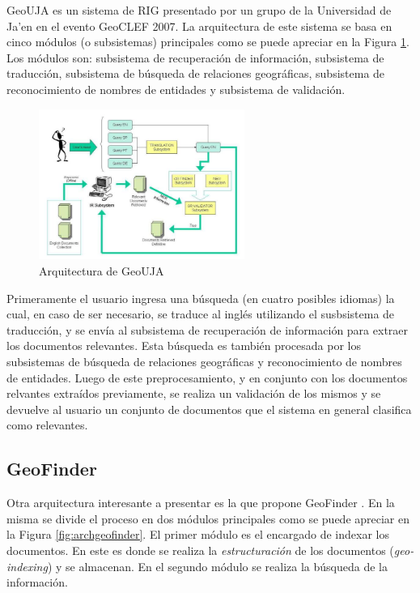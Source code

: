 \documentclass{llncs}
\begin{document}
GeoUJA \cite{perea2007} es un sistema de RIG presentado por un grupo de la
Universidad de Ja'en en el evento GeoCLEF 2007. La arquitectura de este sistema
se basa en cinco módulos (o subsistemas) principales como se puede apreciar en
la Figura \ref{fig:archgeouja}. Los módulos son: subsistema de recuperación de
información, subsistema de traducción, subsistema de búsqueda de relaciones
geográficas, subsistema de reconocimiento de nombres de entidades y subsistema
de validación.

\begin{figure}[htb]%
	\begin{center}
		\includegraphics[width=0.6\textwidth]{geouja_arch.jpg}
	\end{center}
	\caption{Arquitectura de GeoUJA \cite{perea2007}}
	\label{fig:archgeouja}
\end{figure}

Primeramente el usuario ingresa una búsqueda (en cuatro posibles idiomas) la
cual, en caso de ser necesario, se traduce al inglés utilizando el susbsistema
de traducción, y se envía al subsistema de recuperación de información para
extraer los documentos relevantes. Esta búsqueda es también procesada por los
subsistemas de búsqueda de relaciones geográficas y reconocimiento de nombres de
entidades. Luego de este preprocesamiento, y en conjunto con los documentos
relvantes extraídos previamente, se realiza un validación de los mismos y se
devuelve al usuario un conjunto de documentos que el sistema en general
clasifica como relevantes.

\newpage

\subsection{GeoFinder}\label{sec:archgeofinder}

Otra arquitectura interesante a presentar es la que propone GeoFinder
\cite{bordogna2012}. En la misma se divide el proceso en dos módulos principales
como se puede apreciar en la Figura \ref{fig:archgeofinder}. El primer módulo es
el encargado de indexar los documentos. En este es donde se realiza la
\emph{estructuración} de los documentos (\emph{geo-indexing}) y se almacenan.
En el segundo módulo se realiza la búsqueda de la información.
\end{document}
